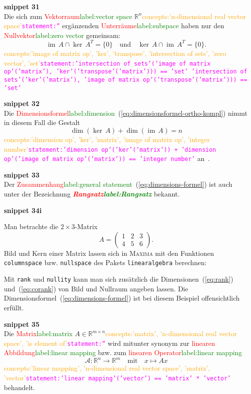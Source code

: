 \documentclass[a4paper,twoside,english,ngerman,deutsch,german,sectrefs,envcountsame,envcountchap]{svmono}
\newcommand{\setref}[2]{\textcolor{red}{#1}\textcolor{green}{#2}}
\newcommand{\snippet}[1]{\textbf{snippet #1}\\}
\newcommand{\eqnote}[2]{\textcolor{orange}{#1}\textcolor{magenta}{\texttt{#2}}}
\begin{document}
\snippet{31}
Die sich zum \setref{Vektorraum}{label:vector space} ${\mathbb{R}}^{n}$\eqnote{concepts:'n-dimensional real vector space'}{statement:''} ergänzenden \setref{Unterräume}{label:subspace} haben nur den \setref{Nullvektor}{label:zero vector} gemeinsam:
\[
{\operatorname{im}}\,A\cap\ker\,A^{T}=\{0\}\quad\text{und}\quad\ker\,A\cap{\operatorname{im}}\,A^{T}=\{0\}.
\]\eqnote{concepts:'image of matrix op', 'ker', 'transpose', 'intersection of sets', 'zero vector', 'set'}{statement:'intersection of sets'('image of matrix op'('matrix'), 'ker'('transpose'('matrix'))) == 'set'
'intersection of sets'('ker'('matrix'), 'image of matrix op'('transpose'('matrix'))) == 'set'}

\snippet{32}
Die \setref{Dimensionsformel}{label:dimension}~(\eqref{eq:dimensionsformel-ortho-kompl}) nimmt in diesem Fall die Gestalt
\begin{equation}
\dim(\ker\,A)+\dim({\operatorname{im}}\,A)=n\label{eq:dimensions-formel}
\end{equation}\eqnote{concepts:'dimension op', 'ker', 'matrix', 'image of matrix op', 'integer number'}{statement:'dimension op'('ker'('matrix')) + 'dimension op'('image of matrix op'('matrix')) == 'integer number'}
an~\cite{lorenz1992,beutelspacher2001}.

\snippet{33}
Der \setref{Zusammenhang}{label:general statement}~(\eqref{eq:dimensions-formel}) ist auch unter der Bezeichnung \textbf{\em \setref{Rangsatz}{label:Rangsatz}} bekannt.

\snippet{34i}


\begin{example}
\label{exa:Bild-und-Kern}Man betrachte die $2\times3$-Matrix
\[
A=\left(\begin{array}{ccc} 1 & 2 & 3\\ 4 & 5 & 6
\end{array}\right).
\]
Bild und Kern einer Matrix lassen sich in \textsc{Maxima} mit den Funktionen \texttt{columnspace} bzw. \texttt{nullspace} des Pakets
\texttt{linearalgebra} berechnen:



Mit \texttt{rank} und \texttt{nullity} kann man sich zusätzlich die Dimensionen~(\eqref{eq:rank}) und~(\eqref{eq:corank}) von Bild und Nullraum angeben lassen. Die Dimensionsformel~(\eqref{eq:dimensions-formel}) ist bei diesem Beispiel offensichtlich erfüllt.

\end{example}


\snippet{35}
Die \setref{Matrix}{label:matrix} $A\in{\mathbb{R}}^{m\times n}$\eqnote{concepts:'matrix', 'n-dimensional real vector space', 'is element of'}{statement:''} wird mitunter synonym zur \setref{linearen Abbildung}{label:linear mapping} bzw. zum \setref{linearen Operator}{label:linear mapping}
\[
\mathcal{A}:{\mathbb{R}}^{n}\to{\mathbb{R}}^{m}\quad\text{mit}\quad x\mapsto Ax
\]\eqnote{concepts:'linear mapping', 'n-dimensional real vector space', 'matrix', 'vector'}{statement:'linear mapping'('vector') == 'matrix' * 'vector'}
behandelt.
\end{document}
